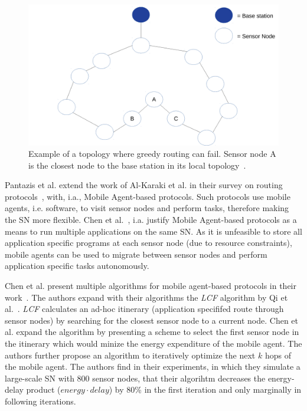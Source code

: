 \begin{figure}[h]
\includegraphics[width=\linewidth]{images/pager-shadow-nodes.pdf}
\caption{Example of a topology where greedy routing can fail. Sensor node A is
the closest node to the base station in its local topology~\cite{zou2004pager}.}
\label{fig:shadow nodes}
\centering
\end{figure}

Pantazis et al. extend the work of Al-Karaki et al. in their survey on routing
protocols~\cite{pantazis2013energy}, with, i.a., Mobile Agent-based protocols.
Such protocols use mobile agents, i.e. software, to visit sensor nodes and
perform tasks, therefore making the \ac{SN} more flexible. Chen et
al.~\cite{chen2007applications}, i.a. justify Mobile Agent-based protocols as a
means to run multiple applications on the same \ac{SN}. As it is unfeasible to
store all application specific programs at each sensor node (due to resource
constraints), mobile agents can be used to migrate between sensor nodes and
perform application specific tasks autonomously.

Chen et al. present multiple algorithms for mobile agent-based protocols in
their work~\cite{chen2011itinerary}. The authors expand with their algorithms
the \textit{LCF} algorithm by Qi et al.~\cite{qi2001optimal}. \textit{LCF}
calculates an ad-hoc itinerary (application specififed route through sensor
nodes) by searching for the closest sensor node to a current node. Chen et al.
expand the algorithm by presenting a scheme to select the first sensor node in
the itinerary which would minize the energy expenditure of the mobile agent.
The authors further propose an algorithm to iteratively optimize the next $ k $
hops of the mobile agent. The authors find in their experiments, in which they
simulate a large-scale \ac{SN} with 800 sensor nodes, that their algorihtm
decreases the energy-delay product ($ energy \cdot delay $) by 80\% in the first
iteration and only marginally in following iterations.

